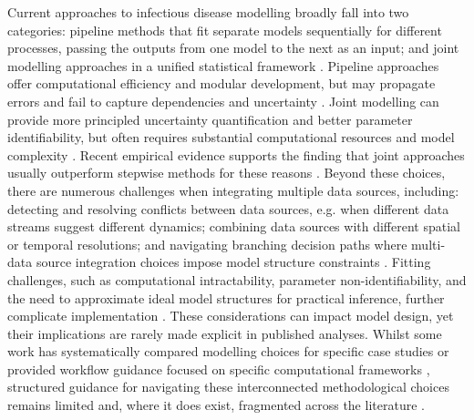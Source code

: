 \documentclass{article}
\begin{document}
Current approaches to infectious disease modelling broadly fall into two categories: pipeline methods that fit separate models sequentially for different processes, passing the outputs from one model to the next as an input; and joint modelling approaches in a unified statistical framework \citep{deangelis2018analysing}.
Pipeline approaches offer computational efficiency and modular development, but may propagate errors and fail to capture dependencies and uncertainty \citep{lison2024generative, Ward2024-sp}.
Joint modelling can provide more principled uncertainty quantification and better parameter identifiability, but often requires substantial computational resources and model complexity \citep{russell2024combined, lison2024generative}.
Recent empirical evidence supports the finding that joint approaches usually outperform stepwise methods for these reasons \citep{lison2024generative}.
Beyond these choices, there are numerous challenges when integrating multiple data sources, including: detecting and resolving conflicts between data sources, e.g. when different data streams suggest different dynamics; combining data sources with different spatial or temporal resolutions; and navigating branching decision paths where multi-data source integration choices impose model structure constraints \citep{deangelis2018analysing, nicholson2022interoperability}.
Fitting challenges, such as computational intractability, parameter non-identifiability, and the need to approximate ideal model structures for practical inference, further complicate implementation \citep{corbella2022inferring, Ward2024-sp}.
These considerations can impact model design, yet their implications are rarely made explicit in published analyses.
Whilst some work has systematically compared modelling choices for specific case studies \citep{bouman2024bayesian} or provided workflow guidance focused on specific computational frameworks \citep{grinsztajn2021bayesian}, structured guidance for navigating these interconnected methodological choices remains limited and, where it does exist, fragmented across the literature
\citep{Behrend2020-au, nicholson2022interoperability, deangelis2018analysing}.
\end{document}
